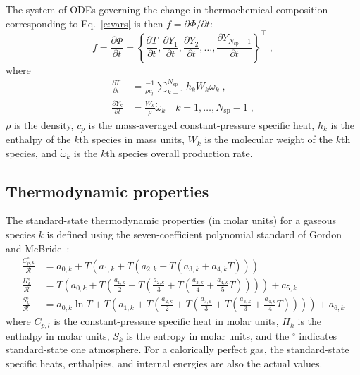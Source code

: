 \documentclass[preprint,12pt]{elsarticle}
\newcommand{ \ddt } [1] { \frac{ \partial #1 }{ \partial t } }
\newcommand{ \numsp }{N_{\text{sp}}}
\begin{document}
The system of ODEs governing the change in thermochemical composition corresponding to Eq.~\eqref{e:vars} is then $ f = \partial \Phi/ \partial t$:
\begin{equation}
f = \ddt{\Phi} = \left \lbrace \ddt{T}, \ddt{Y_1}, \ddt{Y_2}, \dotsc, \ddt{Y_{\numsp - 1}} \right\rbrace^{\intercal} \;,
\label{e:ode}
\end{equation}
where
\begin{align}
\ddt{T} &= \frac{-1}{\rho c_p} \sum_{k=1}^{\numsp} h_k W_k \dot{\omega}_k \;, \\
\ddt{Y_k} &= \frac{W_k}{\rho} \dot{\omega}_k \quad k = 1, \dotsc, \numsp - 1 \;, \label{e:dTdt}
\end{align}
$\rho$ is the density, $c_p$ is the mass-averaged constant-pressure specific heat, $h_k$ is the enthalpy of the $k$th species in mass units, $W_k$ is the molecular weight of the $k$th species, and $\dot{\omega}_k$ is the $k$th species overall production rate.

\subsection{Thermodynamic properties}

The standard-state thermodynamic properties (in molar units) for a gaseous species $k$ is defined using the seven-coefficient polynomial standard of Gordon and McBride~\cite{Gordon:1976wp}:
\begin{align}
\frac{C_{p,k}^{\circ}}{\mathcal{R}} &= a_{0,k} + T \left( a_{1,k} + T \left( a_{2,k} + T \left( a_{3,k} + a_{4,k} T \right) \right) \right) \label{e:cpk} \\
\frac{H_k^{\circ}}{\mathcal{R}} &= T \left( a_{0,k} + T \left( \frac{a_{1,k}}{2} + T \left( \frac{a_{2,k}}{3} + T \left( \frac{a_{3,k}}{4} + \frac{a_{4,k}}{5} T \right) \right) \right) \right) + a_{5,k} \label{e:hk} \\
\frac{S_k^{\circ}}{\mathcal{R}} &= a_{0,k} \ln T + T \left( a_{1,k} + T \left( \frac{a_{2,k}}{2} + T \left( \frac{a_{3,k}}{3} + T \left( \frac{a_{3,k}}{3} + \frac{a_{4,k}}{4} T \right) \right) \right) \right) + a_{6,k} \label{e:sk}
\end{align}
where $C_{p,l}$ is the constant-pressure specific heat in molar units, $H_k$ is the enthalpy in molar units, $S_k$ is the entropy in molar units, and the ${}^{\circ}$ indicates standard-state one atmosphere.
For a calorically perfect gas, the standard-state specific heats, enthalpies, and internal energies are also the actual values.
\end{document}
